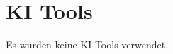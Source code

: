 \makeatletter\@openrightfalse
\chapter{KI Tools}\label{app:supplemental-information}
Es wurden keine KI Tools verwendet. 
\@openrighttrue\makeatother 

